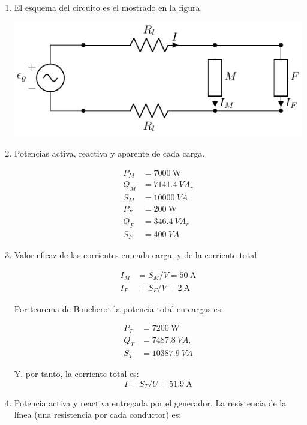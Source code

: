 \begin{enumerate}
  
\item El esquema del circuito es el mostrado en la figura.

\begin{center}
  \includegraphics{figuras/circuito_cargas.pdf}
\end{center}
  
\item Potencias activa, reactiva y aparente de cada carga.

\begin{align*}
  P_M &= \qty{7000}{\watt}\\
  Q_M &= \qty{7141.4}{VA}_r\\
  S_M &= \qty{10000}{VA}\\
  P_F &= \qty{200}{\watt}\\
  Q_F &= \qty{346.4}{VA}_r\\
  S_F &= \qty{400}{VA}
\end{align*}

\item Valor eficaz de las corrientes en cada carga, y de la corriente
  total.

  \begin{align*}
    I_M &= S_M / V = \qty{50}{\ampere}\\
    I_F &= S_F / V = \qty{2}{\ampere}
  \end{align*}

  Por teorema de Boucherot la potencia total en cargas es:

\begin{align*}
  P_T &= \qty{7200}{\watt}\\
  Q_T &= \qty{7487.8}{VA}_r\\
  S_T &= \qty{10387.9}{VA}
\end{align*}

Y, por tanto, la corriente total es:
\[
  I = S_T / U = \qty{51.9}{\ampere}
\]

\item Potencia activa y reactiva entregada por el generador.
La resistencia de la línea (una resistencia por cada conductor) es:


\end{enumerate}
